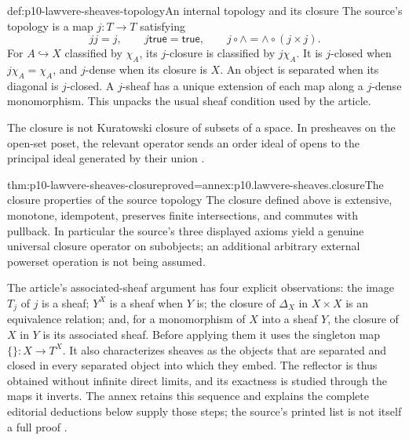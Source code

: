 \begin{hbdefinition}{def:p10-lawvere-sheaves-topology}{An internal topology and its closure}
The source's topology is a map \(j:T\to T\) satisfying
\[
 j j=j,\qquad j\mathsf{true}=\mathsf{true},\qquad
 j\circ\land=\land\circ(j\times j).
\]
For \(A\hookrightarrow X\) classified by \(\chi_A\), its
\(j\)-closure is classified by \(j\chi_A\).  It is
\(j\)-closed when \(j\chi_A=\chi_A\), and \(j\)-dense
when its closure is \(X\).  An object is separated when its
diagonal is \(j\)-closed.  A \(j\)-sheaf has a unique extension
of each map along a \(j\)-dense monomorphism.  This unpacks the
usual sheaf condition used by the article.

The closure is not Kuratowski closure of subsets of a space.  In
presheaves on the open-set poset, the relevant operator sends an
order ideal of opens to the principal ideal generated by their
union \cite[p.~331]{Lawvere1970}.
\end{hbdefinition}

\begin{hbtheorem}{thm:p10-lawvere-sheaves-closure}{proved=annex:p10.lawvere-sheaves.closure}{The closure properties of the source topology}
The closure defined above is extensive, monotone, idempotent,
preserves finite intersections, and commutes with pullback.
In particular the source's three displayed axioms yield a genuine
universal closure operator on subobjects; an additional arbitrary
external powerset operation is not being assumed.
\end{hbtheorem}

The article's associated-sheaf argument has four explicit observations:
the image \(T_j\) of \(j\) is a sheaf; \(Y^X\) is a sheaf
when \(Y\) is; the closure of \(\Delta_X\) in \(X\times X\)
is an equivalence relation; and, for a monomorphism of \(X\) into
a sheaf \(Y\), the closure of \(X\) in \(Y\) is its associated
sheaf.  Before applying them it uses the singleton map
\(\{\}:X\to T^X\).  It also characterizes sheaves as the
objects that are separated and closed in every separated object
into which they embed.  The reflector is thus obtained without
infinite direct limits, and its exactness is studied through the
maps it inverts.  The annex retains this sequence and explains
the complete editorial deductions below supply those steps; the
source's printed list is not itself a full proof
\cite[p.~331]{Lawvere1970}.

